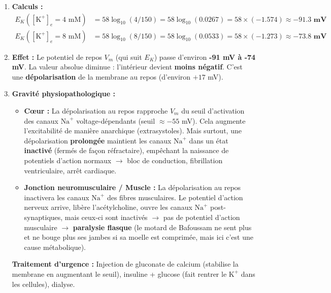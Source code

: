 \documentclass[11pt]{article}
\newcommand{\cle}[1]{{\popxbold\color{popdark}#1}}
\begin{document}
\begin{corrige}
\begin{enumerate}
    \item \textbf{Calculs :}
    \begin{align*}
    E_K([\text{K}^+]_e=4\text{ mM}) &= 58 \log_{10}(4/150) = 58 \log_{10}(0.0267) = 58 \times (-1.574) \approx \mathbf{-91.3 \text{ mV}} \\
    E_K([\text{K}^+]_e=8\text{ mM}) &= 58 \log_{10}(8/150) = 58 \log_{10}(0.0533) = 58 \times (-1.273) \approx \mathbf{-73.8 \text{ mV}}
    \end{align*}
    \item \textbf{Effet :} Le potentiel de repos $V_m$ (qui suit $E_K$) passe d'environ \textbf{-91 mV à -74 mV}. La valeur absolue diminue : l'intérieur devient \textbf{moins négatif}. C'est une \textbf{\cle{dépolarisation}} de la membrane au repos (d'environ $+17$ mV).
    \item \textbf{Gravité physiopathologique :}
    \begin{itemize}
        \item \textbf{Cœur :} La dépolarisation au repos rapproche $V_m$ du seuil d'activation des canaux $\text{Na}^+$ voltage-dépendants (seuil $\approx -55$ mV). Cela augmente l'excitabilité de manière anarchique (extrasystoles). Mais surtout, une dépolarisation \textbf{prolongée} maintient les canaux $\text{Na}^+$ dans un état \textbf{inactivé} (fermés de façon réfractaire), empêchant la naissance de potentiels d'action normaux $\to$ bloc de conduction, fibrillation ventriculaire, arrêt cardiaque.
        \item \textbf{Jonction neuromusculaire / Muscle :} La dépolarisation au repos inactivera les canaux $\text{Na}^+$ des fibres musculaires. Le potentiel d'action nerveux arrive, libère l'acétylcholine, ouvre les canaux $\text{Na}^+$ post-synaptiques, mais ceux-ci sont inactivés $\to$ pas de potentiel d'action musculaire $\to$ \textbf{paralysie flasque} (le motard de Bafoussam ne sent plus et ne bouge plus ses jambes si sa moelle est comprimée, mais ici c'est une cause métabolique).
    \end{itemize}
    \textbf{Traitement d'urgence :} Injection de gluconate de calcium (stabilise la membrane en augmentant le seuil), insuline + glucose (fait rentrer le $\text{K}^+$ dans les cellules), dialyse.
\end{enumerate}
\end{corrige}
\end{document}
